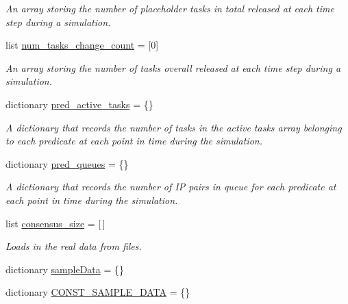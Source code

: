 \begin{DoxyCompactItemize}
\begin{DoxyCompactList}\small\item\em An array storing the number of placeholder tasks in total released at each time step during a simulation. \end{DoxyCompactList}\item 
list \hyperlink{classdynamicfilterapp_1_1test__simulations_1_1_simulation_test_a7c671c228186999a1381c6879ce6fb33}{num\+\_\+tasks\+\_\+change\+\_\+count} = \mbox{[}0\mbox{]}
\begin{DoxyCompactList}\small\item\em An array storing the number of tasks overall released at each time step during a simulation. \end{DoxyCompactList}\item 
dictionary \hyperlink{classdynamicfilterapp_1_1test__simulations_1_1_simulation_test_a99bc70b457bf163e498bda36817b9b4c}{pred\+\_\+active\+\_\+tasks} = \{\}
\begin{DoxyCompactList}\small\item\em A dictionary that records the number of tasks in the active tasks array belonging to each predicate at each point in time during the simulation. \end{DoxyCompactList}\item 
dictionary \hyperlink{classdynamicfilterapp_1_1test__simulations_1_1_simulation_test_a760f519159d3fa0aab64410908d558e8}{pred\+\_\+queues} = \{\}
\begin{DoxyCompactList}\small\item\em A dictionary that records the number of IP pairs in queue for each predicate at each point in time during the simulation. \end{DoxyCompactList}\item 
list \hyperlink{classdynamicfilterapp_1_1test__simulations_1_1_simulation_test_a3524ef5465572a82fd0b944fe640b1ac}{consensus\+\_\+size} = \mbox{[}$\,$\mbox{]}
\begin{DoxyCompactList}\small\item\em Loads in the real data from files. \end{DoxyCompactList}\item 
dictionary \hyperlink{classdynamicfilterapp_1_1test__simulations_1_1_simulation_test_a4f5e4872dbb438cceaeab80fda954631}{sample\+Data} = \{\}
\item 
dictionary \hyperlink{classdynamicfilterapp_1_1test__simulations_1_1_simulation_test_a1b3f4a822bf543618008e30d49dd9345}{C\+O\+N\+S\+T\+\_\+\+S\+A\+M\+P\+L\+E\+\_\+\+D\+A\+TA} = \{\}

\end{DoxyCompactItemize}
